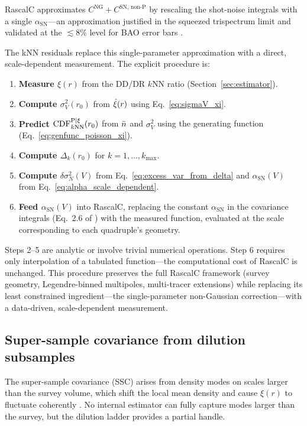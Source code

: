 RascalC approximates $C^{\mathrm{NG}} + C^{\mathrm{SN,\,non\text{-}P}}$ by rescaling the shot-noise integrals with a single $\alpha_{\mathrm{SN}}$---an approximation justified in the squeezed trispectrum limit \citep{Philcox2020} and validated at the $\lesssim 8\%$ level for BAO error bars \citep{Rashkovetskyi2024}.

The kNN residuals replace this single-parameter approximation with a direct, scale-dependent measurement.  The explicit procedure is:

\begin{enumerate}[nosep]
  \item \textbf{Measure $\xi(r)$} from the DD/DR $k$NN ratio (Section~\ref{sec:estimator}).
  \item \textbf{Compute $\sigma_V^2(r_0)$} from $\hat{\xi}(r)$ using Eq.~\eqref{eq:sigmaV_xi}.
  \item \textbf{Predict $\mathrm{CDF}^{\mathrm{P}|\xi}_{k\mathrm{NN}}(r_0)$} from $\bar{n}$ and $\sigma_V^2$ using the generating function (Eq.~\ref{eq:genfunc_poisson_xi}).
  \item \textbf{Compute $\Delta_k(r_0)$} for $k = 1, \ldots, k_{\max}$.
  \item \textbf{Compute $\delta\sigma^2_N(V)$} from Eq.~\eqref{eq:excess_var_from_delta} and $\alpha_{\mathrm{SN}}(V)$ from Eq.~\eqref{eq:alpha_scale_dependent}.
  \item \textbf{Feed $\alpha_{\mathrm{SN}}(V)$} into RascalC, replacing the constant $\alpha_{\mathrm{SN}}$ in the covariance integrals (Eq.~2.6 of \citealt{Rashkovetskyi2024}) with the measured function, evaluated at the scale corresponding to each quadruple's geometry.
\end{enumerate}

Steps 2--5 are analytic or involve trivial numerical operations.  Step 6 requires only interpolation of a tabulated function---the computational cost of RascalC is unchanged.  This procedure preserves the full RascalC framework (survey geometry, Legendre-binned multipoles, multi-tracer extensions) while replacing its least constrained ingredient---the single-parameter non-Gaussian correction---with a data-driven, scale-dependent measurement.

\subsection{Super-sample covariance from dilution subsamples}
\label{sec:ssc}

The super-sample covariance (SSC) arises from density modes on scales larger than the survey volume, which shift the local mean density and cause $\xi(r)$ to fluctuate coherently \citep{Barreira2018}.  No internal estimator can fully capture modes larger than the survey, but the dilution ladder provides a partial handle.

